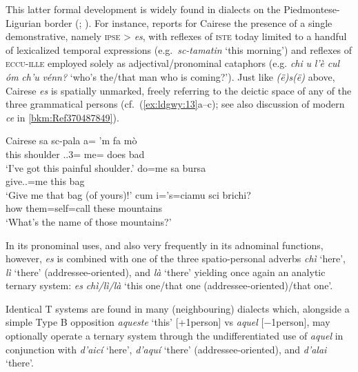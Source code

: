 \documentclass[output=paper]{langsci/langscibook}
\begin{document}
This latter formal development is widely found in dialects on the
Piedmontese-Ligurian border (\citealt[251]{Forner:1997a};
\citealt[98f]{Irsara:2009a}). For instance,
\textcites{Parry:1991a}[150--153]{Parry:2005a} reports for Cairese the presence
of a single demonstrative, namely \textsc{ipse} > \emph{es}, with reflexes of
\textsc{iste} today limited to a handful of lexicalized temporal expressions
(e.g.\ \emph{sc-tamatin} ‘this morning’) and reflexes of \textsc{eccu-ille}
employed solely as adjectival/pronominal cataphors (e.g. \emph{chi} \emph{u}
\emph{l’è} \emph{cul} \emph{óm} \emph{ch’u} \emph{vénn?} ‘who’s the/that man
who is coming?’). Just like \emph{(ë)s(ë)} above, Cairese \emph{es} is
spatially unmarked, freely referring to the deictic space of any of the three
grammatical persons (cf.\ (\ref{ex:ldgwy:13}a--c); see also discussion of
modern  \emph{ce} in \cref{bkm:Ref370487849}).

\ea\label{bkm:Ref370498976}\label{ex:ldgwy:13}Cairese \citep{Parry:1991a,Parry:2005a}
    \ea
    \gll  sa  sc-pala a= ’m  fa  mò\\
             this  shoulder  \Sbj{}.\Cl{}.3=  me=  does  bad\\
    \glt \enquote*{I’ve got this painful shoulder.}
    \ex
    \gll  do=me  sa  bursa\\
             give.\Imp{}.\Ssg{}=me  this  bag\\
    \glt \enquote*{Give me that bag (of yours)!}
    \ex
    \gll  cum  i=’s=ciamu  sci  brichi?\\
             how  them=self=call  these  mountains\\
    \glt \enquote*{What’s the name of those mountains?}
    \z
\z

In its pronominal uses, and also very frequently in its adnominal functions,
however, \emph{es} is combined with one of the three spatio-personal adverbs
\emph{chì} ‘here’, \emph{lì} ‘there’ (addressee-oriented), and \emph{là}
‘there’ yielding once again an analytic ternary system: \emph{es}
\emph{chì/lì/là} ‘this one/that one (addressee-oriented)/that one’.

Identical T systems are found in many (neighbouring)  dialects
\citep[21]{CollegidOccitania} which, alongside a simple Type B
opposition \emph{aqueste} ‘this’ [+1person] vs \emph{aquel}
[−1person], may optionally operate a ternary system through the
undifferentiated use of \emph{aquel} in conjunction with \emph{d’aicí} ‘here’,
\emph{d’aquí} ‘there’ (addressee-oriented), and \emph{d’alai} ‘there’.
\end{document}

